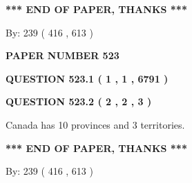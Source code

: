 \documentclass[12pt]{article}
\begin{document}
   
   
   
   
\vspace{1.0in} 
{\textbf{\large{ *** END OF PAPER, THANKS *** }}} 
   
   
\hspace{1.0in} By: 
 239 ( 416 ,  613 )
   
   
   
   
\newpage 
\setcounter{page}{ 
   523001 } 
   
   
   
   
 {\textbf{ \Large{ PAPER NUMBER  523  }}}
   
   
\vspace{0.2in}
   
   
   
   
   
   
 \vspace{0.2in}
 
 
 
 
   
   
  
\vspace{0.2in}
  
{\textbf{\Large{QUESTION
523.1 
 ( 1 , 1 , 6791 )
}}}
  
  
  
\vspace{0.2in}
  
{\textbf{\Large{QUESTION
523.2 
 ( 2 , 2 , 3 )
}}}
  
  
 
 
\noindent{}
 
 
Canada has 10  provinces and 3 territories.
 
 
 
 
   
   
 \vspace{0.2in}
 
   
   
   
   
\vspace{1.0in} 
{\textbf{\large{ *** END OF PAPER, THANKS *** }}} 
   
   
\hspace{1.0in} By: 
 239 ( 416 ,  613 )
   
   
   
   
\newpage 
\setcounter{page}{ 
   524001 } 
   
\end{document}
